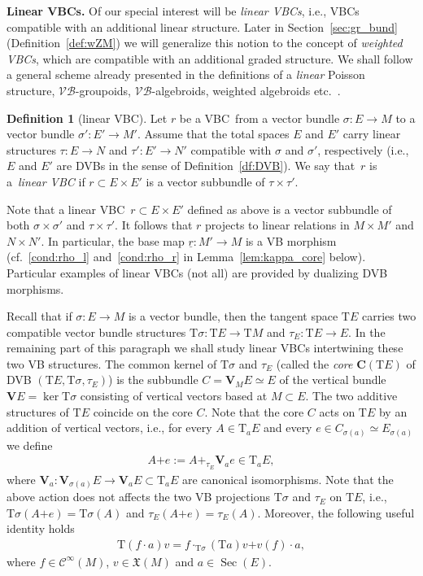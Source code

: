 \documentclass[10pt,a4paper]{amsart}
\newcommand{\ZM}{{VBC}} %
\newcommand{\und}{\underline}
\newcommand{\Sec}{\operatorname{Sec}}
\newcommand{\V}{\mathbf{V}} %
\newcommand{\ra}{\rightarrow}
\newcommand{\plus}{\boldsymbol{\pmb{+}}}
\newcommand{\T}{\mathrm{T}} %
\newcommand{\Core}{\mathbf{C}}
\newcommand{\VB}{\mathcal{VB}} %
\newcommand{\Cf}{\mathcal{C}^\infty}
\newcommand{\VF}{\mathfrak{X}}
\numberwithin{equation}{section}
\theoremstyle{definition}
\newtheorem{df}[thm]{Definition}
\begin{document}
{\bf Linear \ZM s.} Of our special interest will be \emph{linear \ZM s}, i.e., \ZM s compatible with an additional linear structure. Later in Section~\ref{sec:gr_bund} (Definition~\ref{def:wZM}) we will generalize this notion to the concept of \emph{weighted \ZM s}, which are compatible with an additional graded structure. We shall follow a general scheme already presented in the definitions of a \emph{linear} Poisson structure, $\VB$-groupoids, $\VB$-algebroids, weighted algebroids etc.~\cite{BGG, Mackenzie_lie_2005}.

\begin{df}[linear \ZM ] \label{def:linear_ZM} Let $r$ be a \ZM\ from a vector bundle $\sigma\colon E\ra M$ to a vector bundle $ \sigma'\colon E'\ra M'$. Assume that the total spaces $E$ and $E'$ carry linear structures $\tau\colon E\ra N$ and $\tau'\colon E'\ra N'$ compatible with $\sigma$ and $\sigma'$, respectively (i.e., $E$ and $E'$ are DVBs in the sense of Definition~\ref{df:DVB}). We say that~$r$ is a~\emph{linear \ZM } if $r\subset E\times E'$ is a vector subbundle of $\tau\times\tau'$.
 \end{df}

Note that a linear \ZM\ $r\subset E\times E'$ defined as above is a vector subbundle of both $\sigma\times \sigma'$ and $\tau\times\tau '$. It follows that $r$ projects to linear relations in $M\times M'$ and $N\times N'$. In particular, the base map $\und{r}\colon M'\ra M$ is a VB morphism (cf.~\eqref{cond:rho_l} and~\eqref{cond:rho_r} in Lemma~\ref{lem:kappa_core} below). Particular examples of linear \ZM s (not all) are provided by dualizing DVB morphisms.

Recall that if $\sigma\colon E\ra M$ is a vector bundle, then the tangent space $\T E$ carries two compatible vector bundle structures $\T\sigma\colon \T E\ra\T M$ and $\tau_E\colon \T E\ra E$. In the remaining part of this paragraph we shall study linear \ZM s intertwining these two VB structures. The common kernel of  $\T \sigma$ and $\tau _E$ (called the \emph{core} $\Core(\T E)$ of DVB $(\T E, \T \sigma, \tau_E)$) is the
subbundle  $C=\V_M E \simeq E$ of the vertical bundle $\V E = \ker \T \sigma$ consisting of vertical vectors based at $M\subset E$. The two additive structures of $\T E$ coincide on the core $C$. Note that the core $C$  acts on $\T E$ by an addition of vertical vectors, i.e., for every $A\in \T_a E$ and every $e\in C_{\sigma(a)}\simeq E_{\sigma(a)}$ we define
\begin{gather*} A\plus e:=A+_{\tau_E}\V_a e\in \T_a E,\end{gather*}
where $\V_a\colon \V_{\sigma(a)} E \rightarrow \V_a E \subset \T_a E$ are canonical isomorphisms.
Note that the above action does not affects the two VB projections $\T\sigma$ and $\tau_E$ on $\T E$, i.e., $\T\sigma(A\plus e)=\T\sigma(A)$ and $\tau_E(A\plus e)=\tau_E(A)$. Moreover, the following useful identity holds
\begin{gather}\label{eqn:T_fa}
\T(f\cdot a) v = f\cdot_{\T\sigma} (\T a) v \plus v(f)\cdot a,
\end{gather}
where $f\in \Cf(M)$, $v\in \VF(M)$ and $a\in\Sec(E)$.
\end{document}
